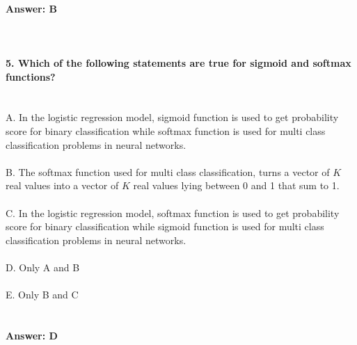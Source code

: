 \documentclass[prl,twocolumn,showpacs,preprintnumbers,superscriptaddress]{revtex4}
\theoremstyle{plain}
\theoremstyle{definition}
\begin{document}
\begin{widetext}
\\
\textbf{Answer: B}
\\
\\
\\
\\
\textbf{5. Which of the following statements are true for sigmoid and softmax functions?}
\\
\\
\\
A. In the logistic regression model, sigmoid function is used to get probability score for binary classification while softmax function is used for multi class classification problems in neural networks.
\\
\\
B. The softmax function used for multi class classification, turns a vector of $K$ real values into a vector of $K$ real values lying between 0 and 1 that sum to 1.
\\
\\
C. In the logistic regression model, softmax function is used to get probability score for binary classification while sigmoid function is used for multi class classification problems in neural networks.
\\
\\
D. Only A and B
\\
\\
E. Only B and C
\\
\\
\\
\textbf{Answer: D}
\\
\\
\\
\\
\\
\\
\end{widetext}
\end{document}
